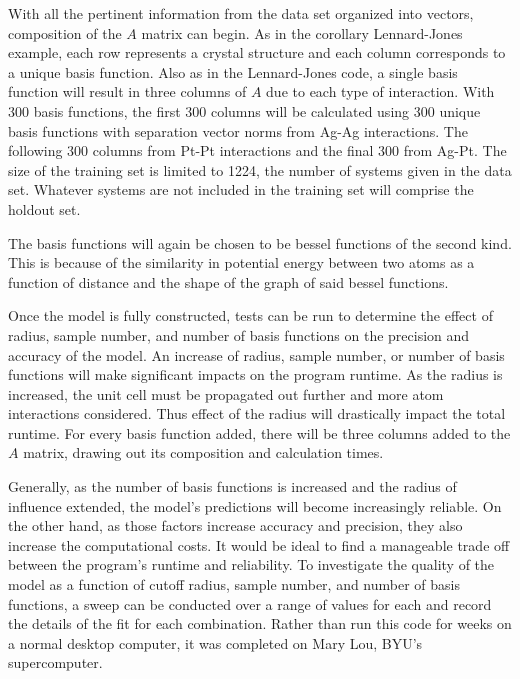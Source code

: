 With all the pertinent information from the data set organized into vectors, composition of the $A$ matrix can begin. As in the corollary Lennard-Jones example, each row represents a crystal structure and each column corresponds to a unique basis function. Also as in the Lennard-Jones code, a single basis function will result in three columns of $A$ due to each type of interaction. With 300 basis functions, the first 300 columns will be calculated using 300 unique basis functions with separation vector norms from Ag-Ag interactions. The following 300 columns from Pt-Pt interactions and the final 300 from Ag-Pt. The size of the training set is limited to 1224, the number of systems given in the data set. Whatever systems are not included in the training set will comprise the holdout set.
\par The basis functions will again be chosen to be bessel functions of the second kind. This is because of the similarity in potential energy between two atoms as a function of distance and the shape of the graph of said bessel functions. 
\par Once the model is fully constructed, tests can be run to determine the effect of radius, sample number, and number of basis functions on the precision and accuracy of the model. An increase of radius, sample number, or number of basis functions will make significant impacts on the program runtime. As the radius is increased, the unit cell must be propagated out further and more atom interactions considered. Thus effect of the radius will drastically impact the total runtime. For every basis function added, there will be three columns added to the $A$ matrix, drawing out its composition and calculation times. 
\par Generally, as the number of basis functions is increased and the radius of influence extended, the model's predictions will become increasingly reliable. On the other hand, as those factors increase accuracy and precision, they also increase the computational costs. It would be ideal to find a manageable trade off between the program's runtime and reliability. To investigate the quality of the model as a function of cutoff radius, sample number, and number of basis functions, a sweep can be conducted over a range of values for each and record the details of the fit for each combination. Rather than run this code for weeks on a normal desktop computer, it was completed on Mary Lou, BYU's supercomputer. 


